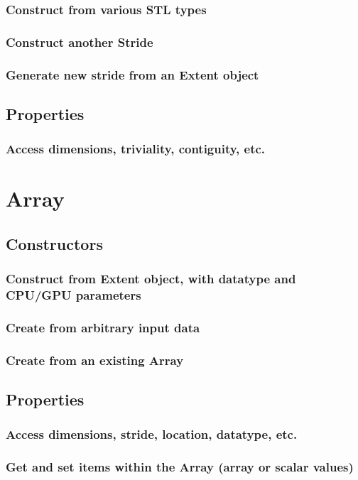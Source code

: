 \documentclass[10pt,a4paper]{report}
\begin{document}
			\subsubsection{Construct from various STL types}
			\subsubsection{Construct another Stride}
			\subsubsection{Generate new stride from an Extent object}
		\subsection{Properties}
			\subsubsection{Access dimensions, triviality, contiguity, etc.}

	\section{Array}
		\subsection{Constructors}
			\subsubsection{Construct from Extent object, with datatype and CPU/GPU parameters}
			\subsubsection{Create from arbitrary input data}
			\subsubsection{Create from an existing Array}
		\subsection{Properties}
			\subsubsection{Access dimensions, stride, location, datatype, etc.}
			\subsubsection{Get and set items within the Array (array or scalar values)}
\end{document}
